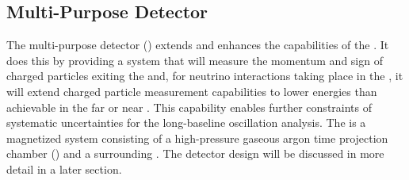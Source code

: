 
\subsection{Multi-Purpose Detector}
\label{ssec:exsum-nd-mpd}
The multi-purpose detector () extends and enhances the capabilities of the .  It does this by providing a system that will measure the momentum and sign of charged particles exiting the  and, for neutrino interactions taking place in the , it will extend charged particle measurement capabilities to lower energies than achievable in the far or near . This capability enables further constraints of systematic uncertainties for the long-baseline oscillation analysis.  
The  is a magnetized system consisting of a high-pressure gaseous argon time projection chamber () and a surrounding . The detector design will be discussed in more detail in a later section.
 
 
 
 
